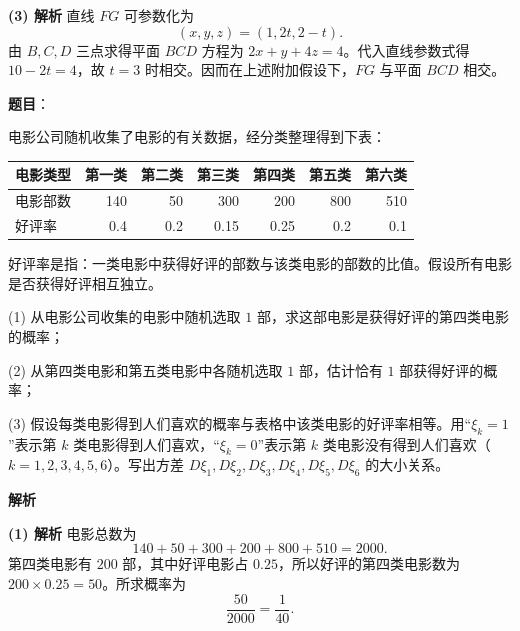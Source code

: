 \begin{answer}
\textbf{(3) 解析} 直线 $FG$ 可参数化为
\nopagebreak[4]
\[
(x,y,z)=(1,2t,2-t).
\]
由 $B,C,D$ 三点求得平面 $BCD$ 方程为 $2x+y+4z=4$。代入直线参数式得 $10-2t=4$，故 $t=3$ 时相交。因而在上述附加假设下，$FG$ 与平面 $BCD$ 相交。




\end{answer}
\begin{answer}

\textbf{题目}：

电影公司随机收集了电影的有关数据，经分类整理得到下表：

\begin{center}
\begin{tabular}{lrrrrrr}
\toprule
电影类型 & 第一类 & 第二类 & 第三类 & 第四类 & 第五类 & 第六类 \\
\midrule
电影部数 & 140 & 50 & 300 & 200 & 800 & 510 \\
好评率 & 0.4 & 0.2 & 0.15 & 0.25 & 0.2 & 0.1 \\
\bottomrule
\end{tabular}
\end{center}

好评率是指：一类电影中获得好评的部数与该类电影的部数的比值。假设所有电影是否获得好评相互独立。

(1) 从电影公司收集的电影中随机选取 $1$ 部，求这部电影是获得好评的第四类电影的概率；

(2) 从第四类电影和第五类电影中各随机选取 $1$ 部，估计恰有 $1$ 部获得好评的概率；

(3) 假设每类电影得到人们喜欢的概率与表格中该类电影的好评率相等。用“$\xi_k=1$”表示第 $k$ 类电影得到人们喜欢，“$\xi_k=0$”表示第 $k$ 类电影没有得到人们喜欢（$k=1,2,3,4,5,6$）。写出方差 $D\xi_1,D\xi_2,D\xi_3,D\xi_4,D\xi_5,D\xi_6$ 的大小关系。

\textbf{解析}

\textbf{(1) 解析} 电影总数为
\nopagebreak[4]
\[
140+50+300+200+800+510=2000.
\]
第四类电影有 $200$ 部，其中好评电影占 $0.25$，所以好评的第四类电影数为 $200\times0.25=50$。所求概率为
\nopagebreak[4]
\[
\frac{50}{2000}=\frac1{40}.
\]


\end{answer}
